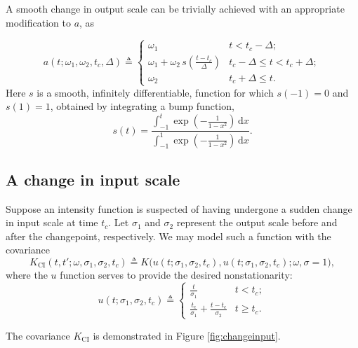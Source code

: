 \documentclass{article}
\newcommand{\deq}{\triangleq}
\newcommand{\intd}[1]{\,\mathrm{d}#1}
\begin{document}
A smooth change in output scale can be trivially achieved with an appropriate modification to $a$, as

\begin{equation*}
  a(t; \omega_1, \omega_2, t_c, \Delta) 
  \deq
  \begin{cases}
    \omega_1 & t < t_c - \Delta; \\
\omega_1 +\omega_2 \,s(\frac{t-t_c}{\Delta})
 & t_c - \Delta \leq t < t_c + \Delta; \\
    \omega_2 & t_c + \Delta \leq t.
  \end{cases}
\end{equation*}
Here $s$ is a smooth, infinitely differentiable, function for which $s(-1)=0$ and $s(1) = 1$, obtained by integrating a bump function,
\begin{equation}
 \label{eq:smooth_fn}
s(t) = \frac{\int_{-1}^t \exp( -\frac{1}{1 - x^2} ) \intd{x}}
{\int_{-1}^1 \exp( -\frac{1}{1 - x^2} ) \intd{x}}.
\end{equation}

\subsection{A change in input scale}

Suppose an intensity function is suspected of having undergone a
sudden change in input scale at time $t_c$.  Let $\sigma_1$ and
$\sigma_2$ represent the output scale before and after the changepoint,
respectively.  We may model such a function with the covariance
\begin{equation*}
  K_{\text{CI}}(t, t'; \omega, \sigma_1, \sigma_2, t_c)
  \deq 
  K
  \bigl(
    u(t; \sigma_1, \sigma_2, t_c), 
    u(t; \sigma_1, \sigma_2, t_c); 
    \omega, \sigma = 1 
  \bigr),
\end{equation*}
where the $u$ function serves to provide the desired nonstationarity:
\begin{equation}
  \label{inchange}
  u(t; \sigma_1, \sigma_2, t_c) 
  \deq
  \begin{cases}
    \frac{t}{\sigma_1} 
    & t < t_c; \\
    \frac{t_c}{\sigma_1} + \frac{t - t_c}{\sigma_2} 
    & t \geq t_c.
  \end{cases}
\end{equation}

The covariance $K_{\text{CI}}$ is demonstrated in Figure
\ref{fig:changeinput}.
\end{document}
